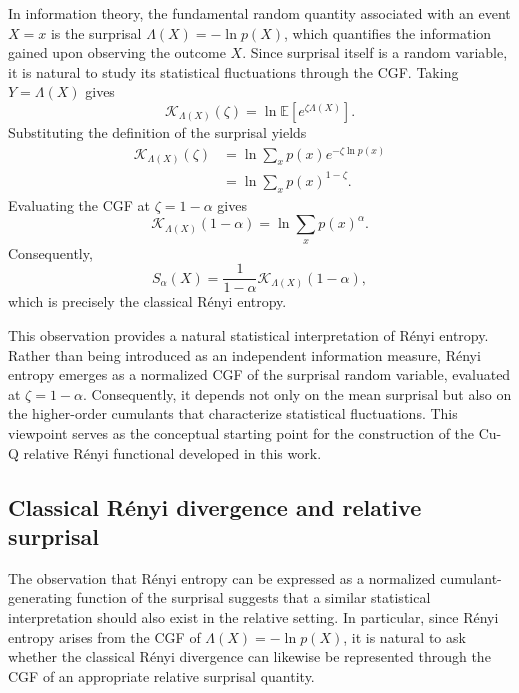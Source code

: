 \documentclass[a4paper, amsfonts, amssymb, amsmath, reprint, showkeys, nofootinbib, twoside, aps, pra]{revtex4-2}
\theoremstyle{definition}
\begin{document}
In information theory, the fundamental random quantity associated with an event $X=x$ is the surprisal $\Lambda(X)=-\ln p(X)$, which quantifies the information gained upon observing the outcome $X$. Since surprisal itself is a random variable, it is natural to study its statistical fluctuations through the CGF. Taking $Y=\Lambda(X)$ gives
\begin{equation}
\mathcal K_{\Lambda(X)}(\zeta)=\ln\mathbb E\left[e^{\zeta\Lambda(X)}\right].
\end{equation}
Substituting the definition of the surprisal yields
\begin{align}
\mathcal K_{\Lambda(X)}(\zeta)
&=
\ln\sum_x p(x) e^{-\zeta\ln p(x)}\nonumber\\
&=
\ln\sum_xp(x)^{1-\zeta}.
\end{align}
Evaluating the CGF at $\zeta = 1-\alpha$ gives
\begin{equation}
\mathcal K_{\Lambda(X)}(1-\alpha)=\ln\sum_x
p(x)^\alpha.
\end{equation}
Consequently,
\begin{equation}
S_\alpha(X)=
\frac{1}{1-\alpha}
\mathcal K_{\Lambda(X)}(1-\alpha),
\end{equation}
which is precisely the classical Rényi entropy.

This observation provides a natural statistical interpretation of Rényi entropy. Rather than being introduced as an independent information measure, Rényi entropy emerges as a normalized CGF of the surprisal random variable, evaluated at $\zeta=1-\alpha$. Consequently, it depends not only on the mean surprisal but also on the higher-order cumulants that characterize statistical fluctuations. This viewpoint serves as the conceptual starting point for the construction of the Cu-Q relative Rényi
functional developed in this work.

\subsection{Classical Rényi divergence and relative surprisal}

The observation that Rényi entropy can be expressed as a normalized cumulant-generating function of the surprisal suggests that a similar statistical interpretation should also exist in the relative setting. In particular, since Rényi entropy arises from the CGF of $\Lambda(X)=-\ln p(X)$, it is natural to ask whether the classical Rényi divergence can likewise be represented through the CGF of an appropriate relative surprisal quantity.
\end{document}
